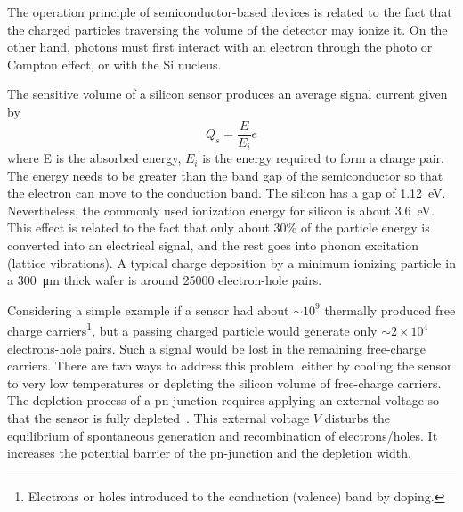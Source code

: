 The operation principle of semiconductor-based devices is related to the fact that the charged particles traversing the volume of the detector may ionize it. %
On the other hand, photons must first interact with an electron through the photo or Compton effect, or with the Si nucleus. 

The sensitive volume of a silicon sensor produces an average signal current given by 
\begin{equation}
    Q_{s} = \frac{E}{E_{i}}e
\end{equation}
where E is the absorbed energy, $E_{i}$ is the energy required to form a charge pair. The energy needs to be greater than the band gap of the semiconductor so that the electron can move to the conduction band. The silicon has a gap of \SI{1.12}{\eV}. Nevertheless, the commonly used ionization energy for silicon is about \SI{3.6}{\eV}. This effect is related to the fact that only about 30\% of the particle energy is converted into an electrical signal, and the rest goes into phonon excitation (lattice vibrations). A typical charge deposition by a minimum ionizing particle in a \SI{300}{\micro\metre} thick wafer is around 25000 electron-hole pairs.

Considering a simple example if a sensor had about $\sim10^{9}$ thermally produced free charge carriers\footnote{Electrons or holes introduced to the conduction (valence) band by doping.}, but a passing charged particle would generate only $\sim2\times10^{4}$ electrons-hole pairs. Such a signal would be lost in the remaining free-charge carriers. There are two ways to address this problem, either by cooling the sensor to very low temperatures or depleting the silicon volume of free-charge carriers. The depletion process of a pn-junction requires applying an external voltage so that the sensor is fully depleted~\cite{Spieler}. This external voltage $V$ disturbs the equilibrium of spontaneous generation and recombination of electrons/holes. It increases the potential barrier of the pn-junction and the depletion width. 

